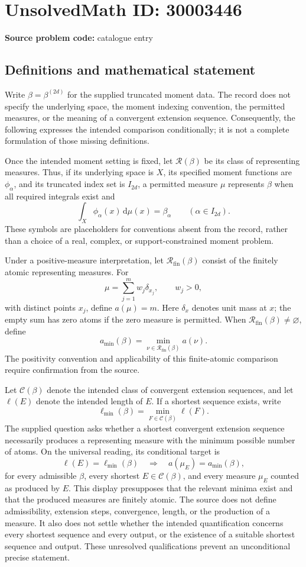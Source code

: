 \documentclass[11pt]{article}
\begin{document}
\section*{UnsolvedMath ID: 30003446}
\textbf{Source problem code:} catalogue entry
\subsection{Definitions and mathematical statement}
Write \(\beta=\beta^{(2d)}\) for the supplied truncated moment data. The record does not specify the underlying space, the moment indexing convention, the permitted measures, or the meaning of a convergent extension sequence. Consequently, the following expresses the intended comparison conditionally; it is not a complete formulation of those missing definitions.

Once the intended moment setting is fixed, let \(\mathcal R(\beta)\) be its class of representing measures. Thus, if its underlying space is \(X\), its specified moment functions are \(\phi_\alpha\), and its truncated index set is \(I_{2d}\), a permitted measure \(\mu\) represents \(\beta\) when all required integrals exist and
\[
\int_X\phi_\alpha(x)\,\mathrm d\mu(x)=\beta_\alpha
\qquad(\alpha\in I_{2d}).
\]
These symbols are placeholders for conventions absent from the record, rather than a choice of a real, complex, or support-constrained moment problem.

Under a positive-measure interpretation, let \(\mathcal R_{\mathrm{fin}}(\beta)\) consist of the finitely atomic representing measures. For
\[
\mu=\sum_{j=1}^{m}w_j\delta_{x_j},
\qquad w_j>0,
\]
with distinct points \(x_j\), define \(a(\mu)=m\). Here \(\delta_x\) denotes unit mass at \(x\); the empty sum has zero atoms if the zero measure is permitted. When \(\mathcal R_{\mathrm{fin}}(\beta)\ne\varnothing\), define
\[
a_{\min}(\beta)=\min_{\nu\in\mathcal R_{\mathrm{fin}}(\beta)}a(\nu).
\]
The positivity convention and applicability of this finite-atomic comparison require confirmation from the source.

Let \(\mathcal C(\beta)\) denote the intended class of convergent extension sequences, and let \(\ell(E)\) denote the intended length of \(E\). If a shortest sequence exists, write
\[
\ell_{\min}(\beta)=\min_{F\in\mathcal C(\beta)}\ell(F).
\]
The supplied question asks whether a shortest convergent extension sequence necessarily produces a representing measure with the minimum possible number of atoms. On the universal reading, its conditional target is
\[
\ell(E)=\ell_{\min}(\beta)
\quad\Longrightarrow\quad
 a(\mu_E)=a_{\min}(\beta),
\]
for every admissible \(\beta\), every shortest \(E\in\mathcal C(\beta)\), and every measure \(\mu_E\) counted as produced by \(E\). This display presupposes that the relevant minima exist and that the produced measures are finitely atomic. The source does not define admissibility, extension steps, convergence, length, or the production of a measure. It also does not settle whether the intended quantification concerns every shortest sequence and every output, or the existence of a suitable shortest sequence and output. These unresolved qualifications prevent an unconditional precise statement.
\end{document}
